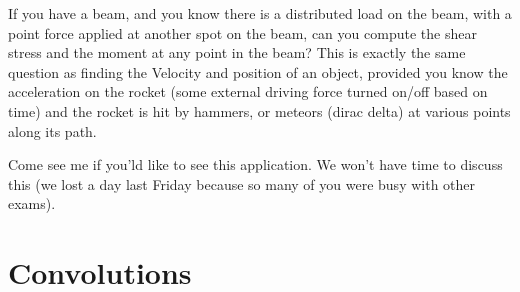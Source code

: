 \begin{problem*}
 If you have a beam, and you know there is a distributed load on the beam, with a point force applied at another spot on the beam, can you compute the shear stress and the moment at any point in the beam?  This is exactly the same question as finding the  Velocity and position of an object, provided you know the acceleration on the rocket (some external driving force turned on/off based on time) and the rocket is hit by hammers, or meteors (dirac delta) at various points along its path.

Come see me if you'ld like to see this application. We won't have time to discuss this (we lost a day last Friday because so many of you were busy with other exams).
\end{problem*}



\section{Convolutions}


